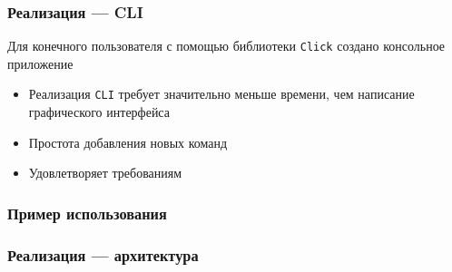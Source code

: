 \documentclass{beamer}
\begin{document}
\begin{frame}[fragile]
	\frametitle{Реализация --- CLI}
	Для конечного пользователя с помощью библиотеки \texttt{Click} создано консольное приложение
	\begin{itemize}
		\item Реализация \texttt{CLI} требует значительно меньше времени, чем написание графического интерфейса
		\item Простота добавления новых команд
		\item Удовлетворяет требованиям
	\end{itemize}

	\begin{figure}[ht]
		\centering
		
		\label{cli}
	\end{figure}
\end{frame}

\begin{frame}
	\frametitle{Пример использования}
	\begin{figure}[ht]
		\raggedright
		
	\end{figure}
\end{frame}

\begin{frame}[fragile]
	\frametitle{Реализация --- архитектура}
	\begin{figure}[ht]
		\centering
		
	\end{figure}
\end{frame}

% 		

\end{document}
